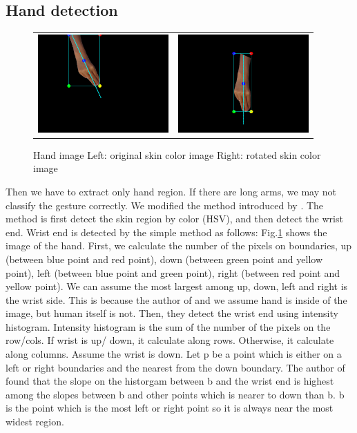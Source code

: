 \subsection{Hand detection}
\begin{figure}
 \centering
 \begin{tabular}{cc}
  \includegraphics[width=5cm]{fig5/ex.png} &
  \includegraphics[width=5cm]{fig5/exng.png}
 \end{tabular}
 \caption{Hand image Left: original skin color image Right: rotated skin color image}
 \label{fig:handim}
\end{figure}
Then we have to extract only hand region. If there are long arms, we may not classify the gesture correctly. We modified the method introduced by \cite{ra11}. The method is first detect the skin region by color (HSV), and then detect the wrist end. Wrist end is detected by the simple method as follows:
Fig.\ref{fig:handim} shows the image of the hand. 
First, we calculate the number of the pixels on boundaries, 
up (between blue point and red point), 
down (between green point and yellow point), left (between blue point and green point), right (between red point and yellow point). 
We can assume the most largest among up, down, left and right is the wrist side. This is because the author of \cite{ra11} and we assume hand is inside of the image, but human itself is not. 
Then, they detect the wrist end using intensity histogram. Intensity histogram is the sum of the number of the pixels on the row/cols. If wrist is up/ down, it calculate along rows. Otherwise, it calculate along columns.
Assume the wrist is down. Let p be a point which is either on a left or right boundaries and the nearest from the down boundary. The author of \cite{ra11} found that the slope on the historgam between b and the wrist end is highest among the slopes between b and other points which is nearer to down than b. b is the point which is the most left or right point so it is always near the most widest region.
